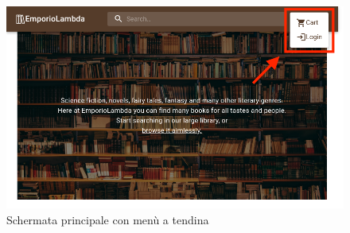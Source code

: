 \begin{figure}[H]
	\centering
	\includegraphics[scale=0.4]{Immagini/Acquirente/home-mobile-open.customer.png}
	\caption{Schermata principale con menù a tendina}
	\label{fig:Homeicone}
\end{figure}
